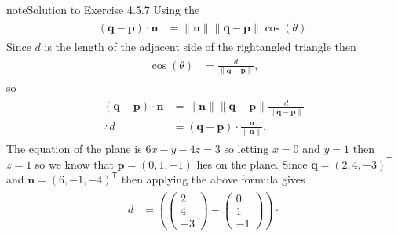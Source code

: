 \documentclass[letterpaper,10pt,english]{jupyterBook}
\begin{document}
\begin{sphinxadmonition}{note}{Solution to Exercise 4.5.7}
\sphinxAtStartPar
Using the {\hyperref[\detokenize{_pages/3.3_Dot_and_cross_products:dot-product-definition}]{}}
\begin{equation*}
\begin{split} \begin{align*}
    (\mathbf{q} - \mathbf{p})\cdot \mathbf{n} &= \|\mathbf{n}\|\|\mathbf{q} - \mathbf{p}\| \cos(\theta).
\end{align*} \end{split}
\end{equation*}
\sphinxAtStartPar
Since \(d\) is the length of the adjacent side of the right\sphinxhyphen{}angled triangle then
\begin{equation*}
\begin{split} \begin{align*}
    \cos(\theta) &= \frac{d}{\|\mathbf{q} - \mathbf{p}\|},
\end{align*} \end{split}
\end{equation*}
\sphinxAtStartPar
so
\begin{equation*}
\begin{split} \begin{align*}
    (\mathbf{q} - \mathbf{p}) \cdot \mathbf{n} &= \|\mathbf{n}\| \|\mathbf{q} - \mathbf{p}\| \frac{d}{\|\mathbf{q} - \mathbf{p}\|} \\
    \therefore d &= (\mathbf{q} - \mathbf{p})\cdot \frac{\mathbf{n}}{\|\mathbf{n}\|}.
\end{align*} \end{split}
\end{equation*}
\sphinxAtStartPar
The equation of the plane is \(6 x-y-4 z=3\) so letting \(x=0\) and \(y=1\) then \(z = 1\) so we know that \(\mathbf{p} = (0, 1, -1)\) lies on the plane. Since \(\mathbf{q} = (2, 4, -3)^\mathsf{T}\) and \(\mathbf{n} = (6, -1, -4)^\mathsf{T}\) then applying the above formula gives
\begin{equation*}
\begin{split} \begin{align*}
    d &= \left( \begin{pmatrix} 2 \\ 4 \\ -3 \end{pmatrix} -
    \begin{pmatrix} 0 \\ 1 \\ -1 \end{pmatrix} \right) \cdot 

\end{align*}
\end{split}
\end{equation*}
\end{sphinxadmonition}
\end{document}
